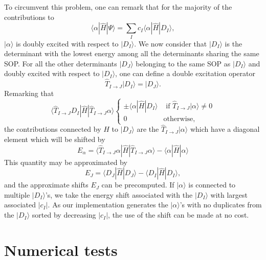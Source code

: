 \documentclass[aip,jcp,reprint,showkeys]{revtex4-1}
\newcommand{\ket}[1]{|#1\rangle}
\newcommand{\sop}{SOP}
\newcommand{\mel}[3]{\langle #1 | #2 | #3 \rangle}
\begin{document}
To circumvent this problem, one can remark that for the majority of the
contributions to
\begin{equation}
 \mel{\alpha}{\hat{H}}{\Psi} = \sum_I c_I \mel{\alpha}{\hat{H}}{D_I},
\end{equation}
$\ket{\alpha}$ is doubly excited with respect to $\ket{D_I}$.
We now consider that $\ket{D_I}$ is the determinant with the lowest
energy among all the determinants sharing the same {\sop}.
For all the other determinants $\ket{D_J}$ belonging to the same {\sop}
as $\ket{D_I}$ and doubly excited with respect to $\ket{D_I}$, one can define
a double excitation operator
\begin{equation}
\hat{T}_{I\rightarrow J} \ket{D_I} = \ket{D_J}.
\end{equation}
Remarking that 
\begin{equation}
\mel{\hat{T}_{I\rightarrow J} D_I}{\hat{H}}{\hat{T}_{I\rightarrow J} \alpha} 
\begin{cases}
\pm \mel{\alpha}{\hat{H}}{D_I} & \text{ if } \hat{T}_{I\rightarrow J}\ket{\alpha} \ne 0 \\
0 & \text{otherwise},
\end{cases}
\end{equation}
the contributions connected by $\hat{H}$ to $\ket{D_J}$ are the
$\hat{T}_{I\rightarrow J} \ket{\alpha}$ which have a diagonal element which
will be shifted by 
\begin{equation}
E_\alpha = \langle \hat{T}_{I\rightarrow J} \alpha | \hat{H} | \hat{T}_{I\rightarrow J} \alpha \rangle - \langle \alpha | \hat{H} | \alpha \rangle
\end{equation}
This quantity may be approximated by
\begin{equation}
E_J = \langle D_J | \hat{H} | D_J \rangle - \langle D_I | \hat{H} | D_I \rangle,
\end{equation}
and the approximate shifts $E_J$ can be precomputed.
If $\ket{\alpha}$ is connected to multiple $\ket{D_I}$'s, we take the energy
shift associated with the $\ket{D_I}$ with largest associated $|c_I|$.  As our
implementation generates the $\ket{\alpha}$'s with no duplicates from the
$\ket{D_I}$ sorted by decreasing $|c_I|$,\cite{Garniron_2017} the use of the
shift can be made at no cost.





\section{Numerical tests}
\end{document}
